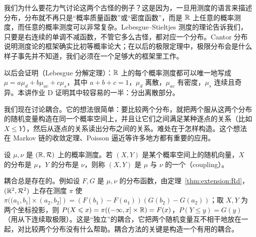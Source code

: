 \begin{remark}
我们为什么要花力气讨论这两个古怪的例子？这是因为，一旦用测度的语言来描述分布，分布就不再只是“概率质量函数”或“密度函数”，而是 $\mathbb{R}$ 上任意的概率测度，而任意的概率测度可以非常复杂。Lebesgue--Stieltjes 测度的理论告诉我们，只要是右连续的单调不减函数，不管它多么古怪，都对应一个分布。Cantor 分布说明测度论的框架确实比初等概率论大；在以后的极限定理中，极限分布会是什么样子事先并不知道，我们必须在一个足够大的框架里工作。
\end{remark}

\begin{remark}
以后会证明（Lebesgue 分解定理）：$\mathbb{R}$ 上的每个概率测度都可以唯一地写成 $\mu=a\mu_d+b\mu_{ac}+c\mu_s$，其中 $a+b+c=1$，$\mu_d$ 离散，$\mu_{ac}$ 有密度，$\mu_s$ 连续且奇异。本讲作业 D 证明其中较容易的一半：分出离散部分。
\end{remark}


我们现在讨论耦合。它的想法很简单：要比较两个分布，就把两个服从这两个分布的随机变量构造在同一个概率空间上，并且让它们之间满足某种逐点的关系（比如 $X\leqslant Y$），然后从逐点的关系读出分布之间的关系。难处在于怎样构造。这个想法在 Markov 链的收敛定理、Poisson 逼近等许多地方都有重要的应用。

\begin{definition}[耦合]\label{def:distributions:coupling}
设 $\mu,\nu$ 是 $(\mathbb{R},\mathcal{R})$ 上的概率测度。若 $(X,Y)$ 是某个概率空间上的随机向量，$X$ 的分布是 $\mu$，$Y$ 的分布是 $\nu$，则称 $(X,Y)$ 是 $\mu$ 与 $\nu$ 的一个（coupling）。
\end{definition}

耦合总是存在的。例如设 $F,G$ 是 $\mu,\nu$ 的分布函数，由定理~\ref{thm:extension:Rd}，$(\mathbb{R}^2,\mathcal{R}^2)$ 上存在测度 $\pi$ 使 $\pi((a_1,b_1]\times(a_2,b_2])=(F(b_1)-F(a_1))(G(b_2)-G(a_2))$；取 $X,Y$ 为两个坐标投影，则 $P(X\leqslant x)=\pi((-\infty,x]\times\mathbb{R})=F(x)$，$P(Y\leqslant y)=G(y)$（用从下连续取极限）。这是“独立”的耦合，它把两个随机变量互不相干地放在一起，对比较两个分布没有什么帮助。耦合方法的关键是构造一个有用的耦合。

